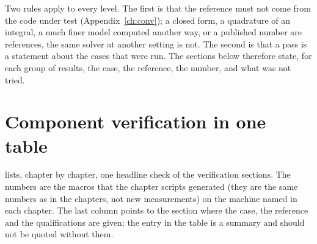 
Two rules apply to every level. The first is that the reference must not come from the code under test (Appendix~\ref{ch:conv}); a closed form, a quadrature of an integral, a much finer model computed another way, or a published number are references, the same solver at another setting is not. The second is that a pass is a statement about the cases that were run. The sections below therefore state, for each group of results, the case, the reference, the number, and what was not tried.

\section{Component verification in one table}\label{sec:vf-component}

 lists, chapter by chapter, one headline check of the verification sections. The numbers are the macros that the chapter scripts generated (they are the same numbers as in the chapters, not new measurements) on the machine named in each chapter. The last column points to the section where the case, the reference and the qualifications are given; the entry in the table is a summary and should not be quoted without them.

